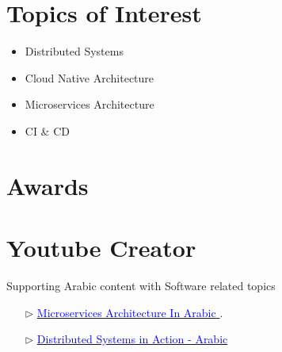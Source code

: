 \documentclass[%
               doublesided,
               paper=a4,
               fontsize=10pt
              ]{my-resume}
\begin{document}
{    \section{Topics of Interest}
    		\begin{itemize}
			\setlength\itemsep{.001em}
			\item Distributed Systems 
			\item Cloud Native Architecture
			\item Microservices Architecture
			\item CI \& CD
		\end{itemize}
		
    \section{Awards}
		
	\section{Youtube Creator}
	Supporting Arabic content with Software related topics
		\begin{itemize}
			\item [$\triangleright$] \href{https://www.youtube.com/watch?v=9pGXaUaMyBo&list=PLgAqrVq84PDdfiDow3YVsgc1q34JD415Z}{\textcolor{blue}{Microservices Architecture In Arabic \faYoutube}} .
			\item [$\triangleright$] \href{https://www.youtube.com/watch?v=RTdpGvrpWOI&list=PLgAqrVq84PDcg55xnbUBHuLS8tWul6-kF&pp=gAQBiAQB}{\textcolor{blue}{Distributed Systems in Action - Arabic \faYoutube}}
		\end{itemize}
    
}
\makebody
\clearpage


\pagestyle{empty}
\end{document}
